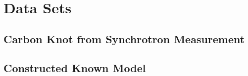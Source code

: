 \chapter{Data Sets} %

\section{Carbon Knot from Synchrotron Measurement}

\section{Constructed Known Model}




